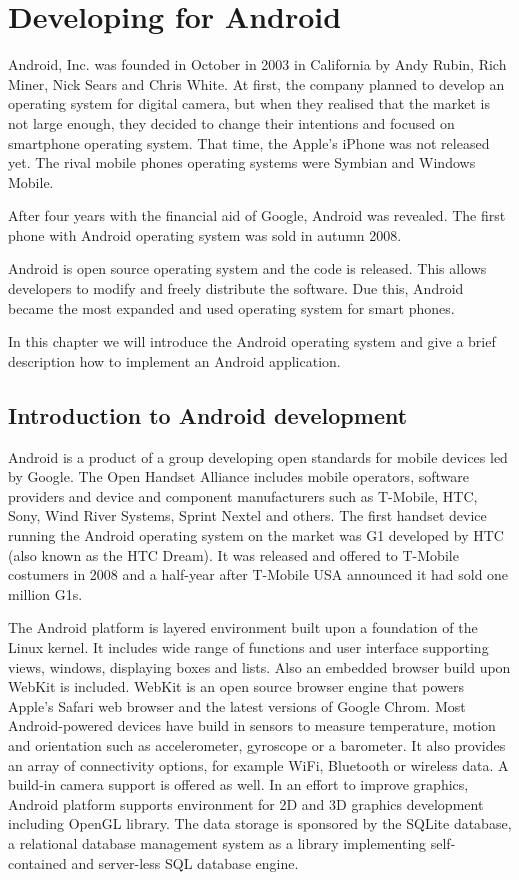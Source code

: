 \chapter{Developing for Android}
Android, Inc\@. was founded in October in 2003 in California by  Andy Rubin, Rich Miner, Nick Sears and Chris White. 
At first, the company planned to develop an operating system for digital camera, but when they realised that the market is not large enough,
they decided to change their intentions and focused on smartphone operating system.
That time, the Apple's iPhone was not released yet. 
The rival mobile phones operating systems were Symbian and Windows Mobile.

After four years with the financial aid of Google, Android was revealed.
The first phone with Android operating system was sold in autumn 2008.

Android is open source operating system and the code is released.
This allows developers to modify and freely distribute the software.
Due this, Android became the most expanded and used operating system for smart phones.

In this chapter we will introduce the Android operating system and give a brief description how to implement an Android application.

\section{Introduction to Android development}
Android is a product of a group developing open standards for mobile devices led by Google.
The Open Handset Alliance includes mobile operators, software providers and device and component manufacturers such as
T-Mobile, HTC, Sony, Wind River Systems, Sprint Nextel and others.
The first handset device running the Android operating system on the market was G1 developed by HTC (also known as the HTC Dream).
It was released and offered to T-Mobile costumers in 2008 and a half-year after T-Mobile USA announced it had sold one million G1s.

The Android platform is layered environment built upon a foundation of the Linux kernel.
It includes wide range of functions and user interface supporting views, windows, displaying boxes and lists.
Also an embedded browser build upon WebKit is included.
WebKit is an open source browser engine that powers Apple's Safari web browser and the latest versions of Google Chrom.
Most Android-powered devices have build in sensors to measure temperature, motion and orientation 
such as accelerometer, gyroscope or a barometer.
It also provides an array of connectivity options, for example WiFi, Bluetooth or wireless data.
A build-in camera support is offered as well.
In an effort to improve graphics, Android platform supports environment for 2D and 3D graphics development including OpenGL library.
The data storage is sponsored by the SQLite database, a relational database management system as a library implementing self-contained and server-less SQL database engine.
 

